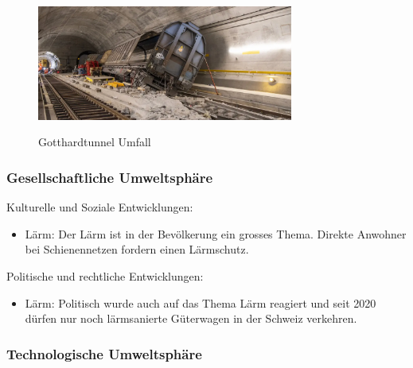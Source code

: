 \documentclass{article}
\begin{document}
\begin{figure}[htbp] %
    \centering
    \includegraphics[width=0.75\textwidth]{umfallGotthard} %
    \caption{Gotthardtunnel Umfall}\parencite[o. S.]{gotthardtunnelBild}
    \label{fig:bildlabel}
\end{figure}

\subsubsection{Gesellschaftliche Umweltsphäre}

Kulturelle und Soziale Entwicklungen:
\begin{itemize}
\item Lärm: Der Lärm ist in der Bevölkerung ein grosses Thema. Direkte Anwohner bei Schienennetzen fordern einen Lärmschutz. 
\end{itemize}
Politische und rechtliche Entwicklungen:
\begin{itemize}
\item Lärm: Politisch wurde auch auf das Thema Lärm reagiert und seit 2020 dürfen nur noch lärmsanierte Güterwagen in der Schweiz verkehren.
\end{itemize}
\parencite[o. S.]{umwelt}

\subsubsection{Technologische Umweltsphäre}
\end{document}
